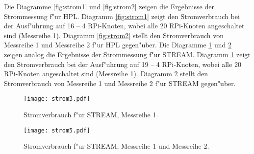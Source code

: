 Die Diagramme \ref{fig:strom1} und \ref{fig:strom2} zeigen die Ergebnisse der Strommessung f"ur HPL. Diagramm \ref{fig:strom1} zeigt den Stromverbrauch bei der Ausf"uhrung auf 16 -- 4 RPi-Knoten, wobei alle 20 RPi-Knoten angeschaltet sind (Messreihe 1). Diagramm \ref{fig:strom2} stellt den Stromverbrauch von Messreihe 1 und Messreihe 2 f"ur HPL gegen"uber. 
\noindent
Die Diagramme \ref{fig:strom3} und \ref{fig:strom4} zeigen analog die Ergebnisse der Strommessung f"ur STREAM. Diagramm \ref{fig:strom3} zeigt den Stromverbrauch bei der Ausf"uhrung auf 19 -- 4 RPi-Knoten, wobei alle 20 RPi-Knoten angeschaltet sind (Messreihe 1). Diagramm \ref{fig:strom4} stellt den Stromverbrauch von Messreihe 1 und Messreihe 2 f"ur STREAM gegen"uber.
\begin{figure}[htb]
  \centering
  \texttt{[image: strom3.pdf]}\\ 
  \caption{Stromverbrauch f"ur STREAM, Messreihe 1.}\label{fig:strom3}
\end{figure}
\begin{figure}[htb]
  \centering
  \texttt{[image: strom5.pdf]}\\ 
  \caption{Stromverbrauch f"ur STREAM, Messreihe 1 und Messreihe 2.}\label{fig:strom4}
\end{figure}
\endinput 


